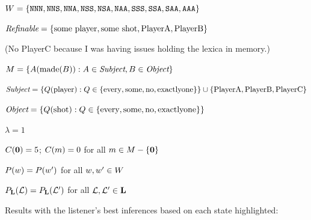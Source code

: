\documentclass{article}
\begin{document}
\begin{examples}
\item

 \begin{examples}
  \item $W = \left\{ \texttt{NNN}, \texttt{NNS}, \texttt{NNA}, \texttt{NSS}, \texttt{NSA}, \texttt{NAA}, \texttt{SSS}, \texttt{SSA}, \texttt{SAA}, \texttt{AAA} \right\}$    
  \item $\textit{Refinable} = \left\{ \text{some player}, \text{some shot}, \text{PlayerA}, \text{PlayerB} \right\}$
  
    (No PlayerC because I was having issues holding the lexica in
    memory.)

  \item $M = \left\{ A(\text{made}(B)) : A \in\textit{Subject}, B \in  \textit{Object} \right\}$
    \begin{examples}
    \item $\textit{Subject} = \left\{ Q(\text{player}) : Q \in \left\{ \text{every}, \text{some}, \text{no}, \text{exactlyone} \right\} \right\} \cup \left\{ \text{PlayerA}, \text{PlayerB}, \text{PlayerC} \right\}$
    \item $\textit{Object} = \left\{ Q(\text{shot}) : Q \in \left\{ \text{every}, \text{some}, \text{no}, \text{exactlyone} \right\} \right\}$
    \end{examples}
  \item $\lambda = 1$
  \item $C(\mathbf{0}) = 5$; $C(m) = 0$ for all $m \in M-\left\{ \mathbf{0} \right\}$  
  \item $P(w) = P(w')$ for all $w, w' \in W$
  \item $P_{\mathbf{L}}(\mathcal{L}) = P_{\mathbf{L}}(\mathcal{L}')$ for all $\mathcal{L}, \mathcal{L}' \in \mathbf{L}$
  \end{examples}

\item Results with the listener's best inferences based on each state
  highlighted: 


\end{examples}
\end{document}
